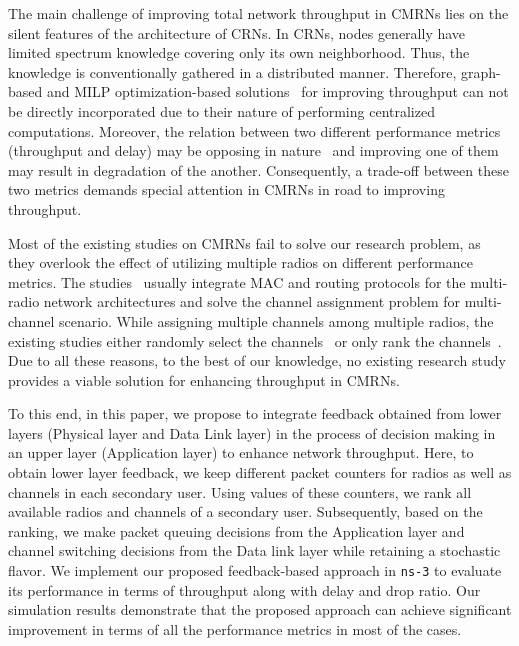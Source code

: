The main challenge of improving total network throughput in CMRNs lies on the silent features of the architecture of CRNs. In CRNs, nodes generally have limited spectrum knowledge covering only its own neighborhood. Thus, the knowledge is conventionally gathered in a distributed manner. Therefore, graph-based and MILP optimization-based solutions~\cite{hoang2008downlink,ahmed2014channel} for improving throughput can not be directly incorporated due to their nature of performing centralized computations. Moreover, the relation between two different performance metrics (throughput and delay) may be opposing in nature~\cite{gamal2004throughput} and improving one of them may result in degradation of the another. Consequently, a trade-off between these two metrics demands special attention in CMRNs in road to improving throughput.

Most of the existing studies on CMRNs fail to solve our research problem, as they overlook the effect of utilizing multiple radios on different performance metrics. The studies~\cite{de2012survey, feng2009joint, zhong2014capacity, li2014deterministic} usually integrate MAC and routing protocols for the multi-radio network architectures and solve the channel assignment problem for multi-channel scenario. While assigning multiple channels among multiple radios, the existing studies either randomly select the channels~\cite{khan2015towards} or only rank the channels~\cite{zhong2014capacity}. Due to all these reasons, to the best of our knowledge, no existing research study provides a viable solution for enhancing throughput in CMRNs.

To this end, in this paper, we propose to integrate feedback obtained from lower layers (Physical layer and Data Link layer) in the process of decision making in an upper layer (Application layer) to enhance network throughput. Here, to obtain lower layer feedback, we keep different packet counters for radios as well as channels in each secondary user. Using values of these counters, we rank all available radios and channels of a secondary user. Subsequently, based on the ranking, we make packet queuing decisions from the Application layer and channel switching decisions from the Data link layer while retaining a stochastic flavor. We implement our proposed feedback-based approach in \texttt{ns-3} to evaluate its performance in terms of throughput along with delay and drop ratio. Our simulation results demonstrate that the proposed approach can achieve significant improvement in terms of all the performance metrics in most of the cases.

